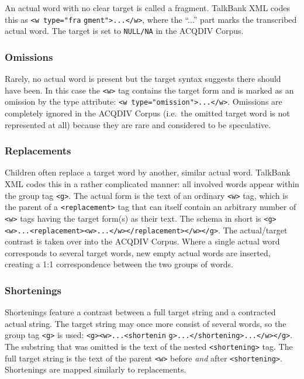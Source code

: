 \documentclass[a4paper, 11pt]{book}
\begin{document}
An actual word with no clear target is called a fragment. TalkBank XML codes this as \texttt{<w type="fra} \texttt{gment">...</w>}, where the “...” part marks the transcribed actual word. The target is set to \texttt{NULL/NA} in the ACQDIV Corpus.

\subsubsection*{Omissions}

Rarely, no actual word is present but the target syntax suggests there should have been. In this case the \texttt{<w>} tag contains the target form and is marked as an omission by the type attribute: \texttt{<w type="omission">...</w>}. Omissions are completely ignored in the ACQDIV Corpus (i.e.\ the omitted target word is not represented at all) because they are rare and considered to be speculative.

\subsubsection*{Replacements}

Children often replace a target word by another, similar actual word. TalkBank XML codes this in a rather complicated manner: all involved words appear within the group tag \texttt{<g>}. The actual form is the text of an ordinary \texttt{<w>} tag, which is the parent of a \texttt{<replacement>} tag that can itself contain an arbitrary number of \texttt{<w>} tags having the target form(s) as their text. The schema in short is \texttt{<g><w>...<replacement><w>...</w></replacement></w></g>}. The actual/target contrast is taken over into the ACQDIV Corpus. Where a single actual word corresponds to several target words, new empty actual words are inserted, creating a 1:1 correspondence between the two groups of words.

\subsubsection*{Shortenings}

Shortenings feature a contrast between a full target string and a contracted actual string. The target string may once more consist of several words, so the group tag \texttt{<g>} is used: \texttt{<g><w>...<shortenin} \texttt{g>...</shortening>...</w></g>}. The substring that was omitted is the text of the nested \texttt{<shortening>} tag. The full target string is the text of the parent \texttt{<w>} before \emph{and} after \texttt{<shortening>}. Shortenings are mapped similarly to replacements.
\end{document}

